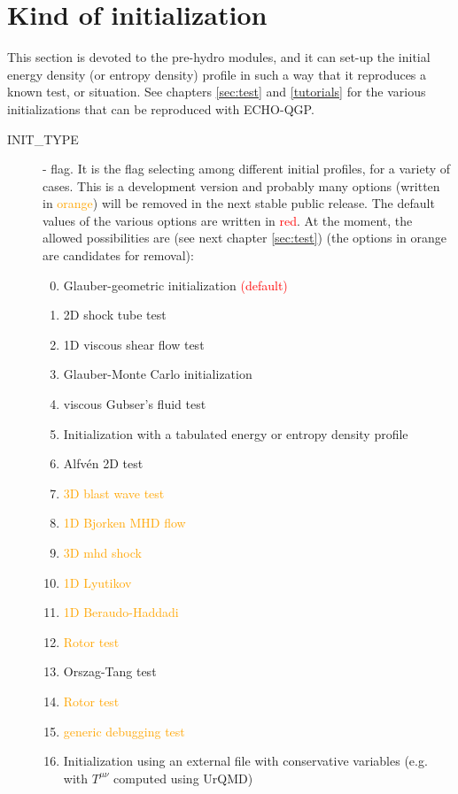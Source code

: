 

\section{Kind of initialization}
This section is devoted to the pre-hydro modules, and it can set-up the initial energy density (or entropy density) profile in such a way that it reproduces a known test, or situation. See chapters \ref{sec:test} and \ref{tutorials} for the various initializations that can be reproduced with ECHO-QGP.
\begin{description}
\item[INIT\_TYPE] \integer - flag.  It is the flag selecting among different initial profiles, for a variety of cases. This is a development version and probably many options (written in \textcolor{orange}{orange}) will be removed in the next stable public release. The default values of the various options are written in \textcolor{red}{red}. At the moment, the allowed possibilities are (see next chapter \ref{sec:test}) (the options in orange are candidates for removal):
\begin{enumerate}
\setcounter{enumi}{-1}
\item Glauber-geometric initialization \textcolor{red}{(default)}
\item 2D shock tube test 
\item 1D viscous shear flow test
\item Glauber-Monte Carlo initialization
\item viscous Gubser's fluid test
\item Initialization with a tabulated energy or entropy density profile
\item Alfvén 2D test
\item \textcolor{orange}{3D blast wave test}
\item \textcolor{orange}{1D Bjorken MHD flow}
\item \textcolor{orange}{3D mhd shock}
\item \textcolor{orange}{1D Lyutikov}
\item \textcolor{orange}{1D Beraudo-Haddadi}
\item \textcolor{orange}{Rotor test}
\item Orszag-Tang test
\item \textcolor{orange}{Rotor test}
\item \textcolor{orange}{generic debugging test}
\item Initialization using an external file with conservative variables (e.g. with $T^{\mu \nu}$ computed using UrQMD)

\end{enumerate}
\end{description}
% 

